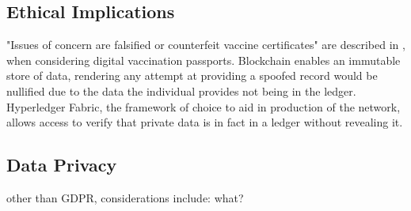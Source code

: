  \subsection{Ethical Implications}
 
 "Issues of concern are falsified or counterfeit vaccine certificates" are described in \cite{schlagenhauf_variants_2021}, when considering digital vaccination passports. 
 Blockchain enables an immutable store of data, rendering any attempt at providing a spoofed record would be nullified due to the data the individual provides not being in the ledger.
 Hyperledger Fabric, the framework of choice to aid in production of the network, allows access to verify that private data is in fact in a ledger without revealing it. %
 
 \subsection{Data Privacy}
 
 other than GDPR, considerations include: what?
 